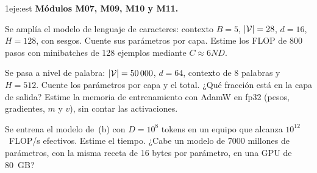 \begin{ejercicio}{1}{eje:est}
\textbf{Módulos M07, M09, M10 y M11.}
\begin{apartados}
  \item {} Se amplía el modelo de lenguaje de caracteres: contexto $B=5$, $\lvert\mathcal{V}\rvert=28$, $d=16$, $H=128$, con sesgos. Cuente sus parámetros por capa. Estime los FLOP de 800 pasos con minibatches de 128 ejemplos mediante $C\approx 6ND$.
  \item {} Se pasa a nivel de palabra: $\lvert\mathcal{V}\rvert=50\,000$, $d=64$, contexto de 8 palabras y $H=512$. Cuente los parámetros por capa y el total. ¿Qué fracción está en la capa de salida? Estime la memoria de entrenamiento con AdamW en fp32 (pesos, gradientes, $m$ y $v$), sin contar las activaciones.
  \item {} Se entrena el modelo de~(b) con $D=10^{8}$ tokens en un equipo que alcanza $10^{12}$~FLOP/s efectivos. Estime el tiempo. ¿Cabe un modelo de 7000 millones de parámetros, con la misma receta de 16 bytes por parámetro, en una GPU de 80~GB?
\end{apartados}
\end{ejercicio}
